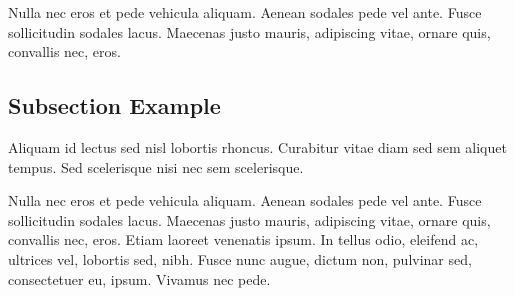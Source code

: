Nulla nec eros et pede vehicula aliquam. Aenean sodales pede vel
ante. Fusce sollicitudin sodales lacus. Maecenas justo mauris,
adipiscing vitae, ornare quis, convallis nec, eros. 

\subsection{Subsection Example}

Aliquam id lectus sed nisl lobortis rhoncus. 
Curabitur vitae diam sed sem aliquet tempus. Sed scelerisque 
nisi nec sem \textcite{khakipoor_linear_2023,liu_energy_2023} scelerisque.

Nulla nec eros et pede vehicula aliquam. Aenean sodales pede vel
ante. Fusce sollicitudin sodales lacus. Maecenas justo mauris,
adipiscing vitae, ornare quis, convallis nec, eros. Etiam laoreet
venenatis ipsum. In tellus odio, eleifend ac, ultrices vel, lobortis
sed, nibh. Fusce nunc augue, dictum non, pulvinar sed, consectetuer
eu, ipsum. Vivamus nec pede.  

